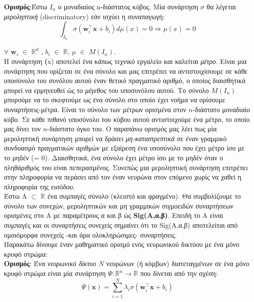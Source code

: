 \documentclass[11pt]{article} %
\numberwithin{equation}{subsection}
\begin{document}
\textbf{Ορισμός}:Έστω $Ι_n$ ο μοναδιαίος n-διάστατος κύβος. Μία συνάρτηση $\sigma$ θα λέγεται \textit{μεροληπτική} (discriminatory) εάν ισχύει η συναπαγωγή: \\
\begin{equation}
 \displaystyle \int_{I_n} \sigma(\textbf{w}_i ^\intercal \mathbf{x} + b_i) d\mu(x) = 0 \Rightarrow \mu(x) = 0  
\end{equation} 

$\forall$ $\textbf{w}_i$ $\in$   $\mathbb{R}^d$ , $b_i$ $\in$ $\mathbb{R}$, $\mu$ $\in$ $M(I_n)$.\\

Η συνάρτηση \mu \textbf(x) αποτελεί ένα κάπως τεχνικό εργαλείο και καλείται \textit{μέτρο}. Είναι μια συνάρτηση που ορίζεται σε ένα σύνολο και μας επιτρέπει να αντιστοιχίσουμε σε κάθε υποσύνολο του συνόλου αυτού έναν θετικό πραγματικό αριθμό, ο οποίος διαισθητικά μπορεί να ερμηνευθεί ώς το \textit{μέγεθος} του υποσυνόλου αυτού. Το σύνολο $M(I_n)$ μπορούμε να το σκεφτούμε ως ένα σύνολο στο οποίο έχει νοήμα να ορίσουμε συναρτήσεις-μέτρα. Είναι το σύνολο των μέτρων ορισμένα στον $n$-διάστατο μοναδιαίο κύβο. Σε κάθε πιθανό υποσύνολο του κύβου αυτού αντιστοιχούμε ένα μέτρο, το οποίο μας δίνει τον $n$-διάστατο όγκο του. Ο παραπάνω ορισμός μας λέει πως μία μεροληπτική συνάρτηση μπορεί να δράσει \textit{μη-καταστρεπτικά} σε έναν γραμμικό συνδυασμό πραγματικών αριθμών με εξαίρεση ένα υποσύνολο που έχει μέτρο ίσο με το μηδέν (\mu = 0). Διαισθητικά, ένα σύνολο έχει μέτρο ίσο με το μηδέν όταν ο πληθάριθμός του είναι πεπερασμένος. Συνεπώς μια μεροληπτική συνάρτηση επιτρέπει στην πληροφορία να περάσει από τον έναν νευρώνα στον επόμενο χωρίς να χαθεί η πληροφορία της εισόδου.\\

Έστω Α $\subset$ $\mathbb{R}$ ένα συμπαγές σύνολο (κλειστό και φραγμένο). Θα συμβολίζουμε το σύνολο των συνεχών, μεροληπτικών και μη γραμμικών σιγμοειδών συναρτήσεων ορισμένες στο Α με παραμέτρους α και β ώς \textbf{Sig(A,α,β)}. Επειδή το Α είναι συμπαγές και οι συναρτήσεις συνεχείς σημαίνει ότι το Sig(A,α,β) αποτελείται από ομοιόμορφα συνεχείς -και άρα ολοκληρώσιμες- συναρτήσεις. \\

Παρακάτω δίνουμε έναν μαθηματικό ορισμό ενός νευρωνικού δικτύου με ένα μόνο κρυφό στρώμα: \\

\textbf{Ορισμός}: Ένα \textit{νευρωνικό δίκτυο} $Ν$ νευρώνων (ή κόμβων) διατεταγμένων σε ένα μόνο κρυφό στρώμα είναι μία συνάρτηση $\Psi : \mathbb{R}^n \rightarrow \mathbb{R}$ που δίνεται από την σχέση:
\begin{equation}
 \displaystyle \Psi(\textbf{x}) = \sum_{i=1}^{N} \lambda_i \sigma(\textbf{w}_i ^ \intercal \textbf{x} + b_i)
\end{equation}
\end{document}
